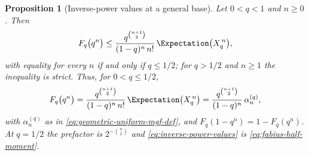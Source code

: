 \documentclass[11pt,a4paper,oneside,openany]{book}
\newtheorem{proposition}[proposition]{Proposition}
\theoremstyle{definition}
\theoremstyle{remark}
\begin{document}

\begin{proposition}[Inverse-power values at a general base]\label{prop:inverse-power-values}
Let $0<q<1$ and $n\ge0$.  Then
\begin{equation}\label{eq:inverse-power-inequality}
 F_q\bigl(q^n\bigr)\le\frac{q^{\binom{n+1}{2}}}{(1-q)^n\,n!}\,\Expectation\bigl(X_q^{\,n}\bigr),
\end{equation}
with equality for every $n$ if and only if $q\le1/2$; for $q>1/2$ and $n\ge1$ the
inequality is strict.  Thus, for $0<q\le1/2$,
\begin{equation}\label{eq:inverse-power-values}
 F_q\bigl(q^n\bigr)
 =\frac{q^{\binom{n+1}{2}}}{(1-q)^n\,n!}\,\Expectation\bigl(X_q^{\,n}\bigr)
 =\frac{q^{\binom{n+1}{2}}}{(1-q)^n}\,\alpha^{(q)}_n ,
\end{equation}
with $\alpha^{(q)}_n$ as in \eqref{eq:geometric-uniform-mgf-def}, and
$F_q(1-q^n)=1-F_q(q^n)$.  At $q=1/2$ the prefactor is $2^{-\binom n2}$ and
\eqref{eq:inverse-power-values} is \eqref{eq:fabius-half-moment}.
\end{proposition}
\end{document}
